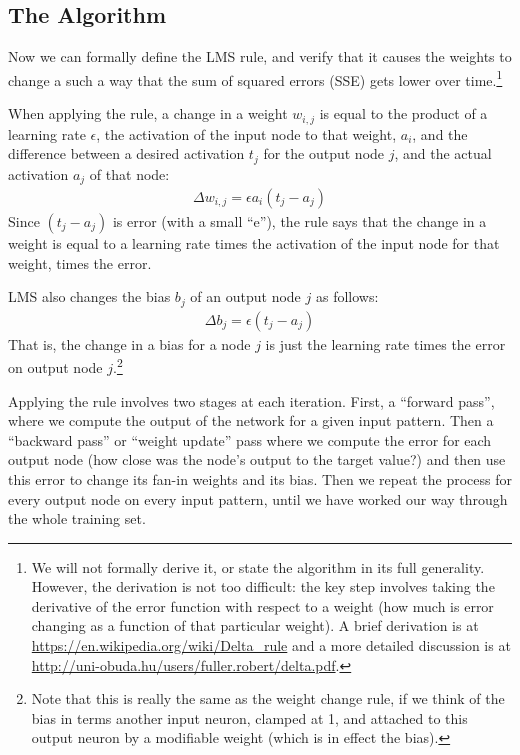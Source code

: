 \subsection{The Algorithm}

Now we can formally define the LMS rule, and verify that it causes the weights to change a such a way that the sum of squared errors (SSE) gets lower over time.\footnote{We will not formally derive it, or state the algorithm in its full generality. However, the derivation is not too difficult: the key step involves taking the derivative of the error function with respect to a weight (how much is error changing as a function of that particular weight). A brief derivation is at \url{https://en.wikipedia.org/wiki/Delta_rule} and a more detailed discussion is at \url{http://uni-obuda.hu/users/fuller.robert/delta.pdf}.}

When applying the rule, a change in a weight $w_{i,j}$ is equal to the product of a learning rate $\epsilon$, the activation of the input node to that weight, $a_i$, and the difference between a desired activation $t_j$ for the output node $j$, and the actual activation $a_j$ of that node:
\begin{eqnarray*}
\Delta w_{i,j}  =  \epsilon a_i (t_j - a_j)
\end{eqnarray*}
Since $(t_j - a_j)$ is error  (with a small ``e''), the rule says that the change in a weight is equal to a learning rate times the activation of the input node for that weight, times the error. 

LMS also changes the bias $b_j$ of an output node $j$ as follows: 
\begin{eqnarray*}
\Delta b_j  =  \epsilon (t_j - a_j)
\end{eqnarray*}
That is, the change in a bias for a node $j$ is just the learning rate times the error on output node $j$.\footnote{Note that this is really the same as the weight change rule, if we think of the bias in terms another input neuron, clamped at 1, and attached to this output neuron by a modifiable weight (which is in effect the bias).}

Applying the rule involves two stages at each iteration. First, a ``forward pass'', where we compute the output of the network for a given input pattern. Then a ``backward pass'' or ``weight update'' pass where we compute the error for each output node (how close was the node's output to the target value?) and then use this error to change its fan-in weights and its bias. Then we repeat the process for every output node on every input pattern, until we have worked our way through the whole training set. 

